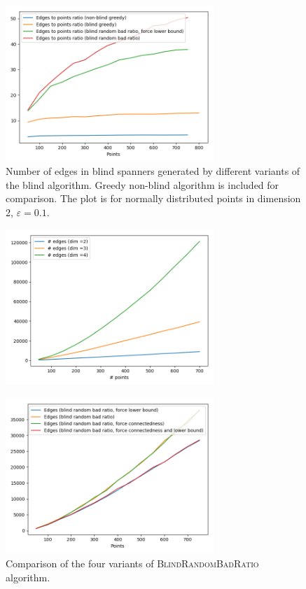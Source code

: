 \documentclass[a4paper,USenglish]{socg-lipics-v2018}
\newcommand{\eps}{\varepsilon}
\begin{document}
\begin{figure}[ht]
    \label{fig:spanner-sparseness}
    \includegraphics[width=0.7\textwidth]{pics/edges_to_points_ratio_dim_2_normal_points.png}
    \caption{Number of edges in blind spanners generated by different variants of the blind
    algorithm. Greedy non-blind algorithm is included for comparison. The plot is for normally distributed points
    in dimension 2, $\eps = 0.1$.}
\end{figure}

\begin{figure}[ht]
    \label{fig:blind-greedy-only}
    \includegraphics[width=0.7\textwidth]{pics/blind-greedy-dims.png}
    \caption{}
\end{figure}

\begin{figure}[ht]
    \label{fig:blind-rbr-variants}
    \includegraphics[width=0.7\textwidth]{pics/random-bad-ratio-comparison.png}
    \caption{Comparison of the four variants of \textsc{BlindRandomBadRatio} algorithm.}
\end{figure}
\end{document}
